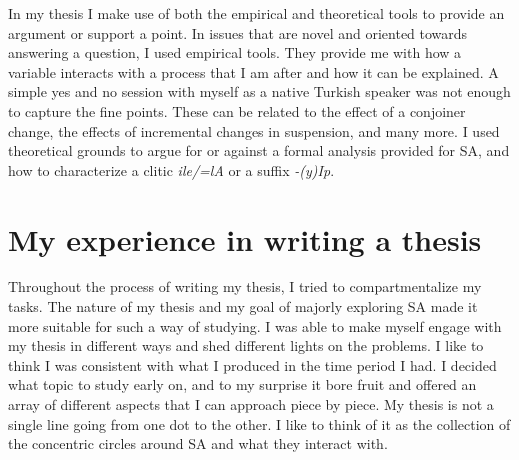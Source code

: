In my thesis I make use of both the empirical and theoretical tools to provide an argument or support a point. In issues that are novel and oriented towards answering a question, I used empirical tools. They provide me with how a variable interacts with a process that I am after and how it can be explained. A simple yes and no session with myself as a native Turkish speaker was not enough to capture the fine points. These can be related to the effect of a conjoiner change, the effects of incremental changes in suspension, and many more. I used theoretical grounds to argue for or against a formal analysis provided for SA, and how to characterize a clitic \textit{ile/=lA} or a suffix \textit{-(y)Ip}. 

\section{My experience in writing a thesis}

Throughout the process of writing my thesis, I tried to compartmentalize my tasks. The nature of my thesis and my goal of majorly exploring SA made it more suitable for such a way of studying. I was able to make myself engage with my thesis in different ways and shed different lights on the problems. I like to think I was consistent with what I produced in the time period I had. I decided what topic to study early on, and to my surprise it bore fruit and offered an array of different aspects that I can approach piece by piece. My thesis is not a single line going from one dot to the other. I like to think of it as the collection of the concentric circles around SA and what they interact with. 
